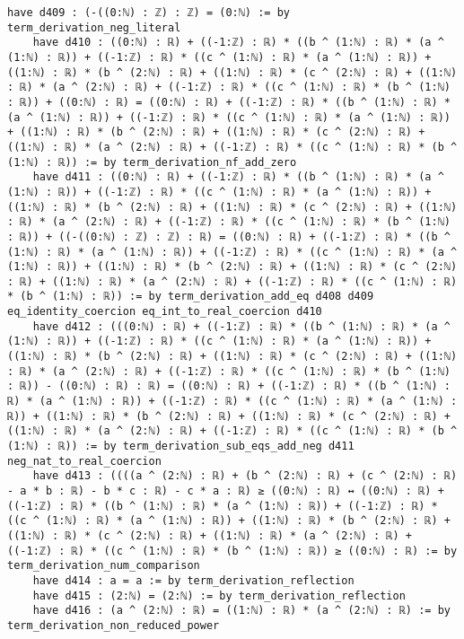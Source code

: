 \documentclass{article}
\begin{document}
\begin{tcolorbox}[colback=white!10, width=\linewidth]
\begin{lstlisting}[language=Lean4]
    have d409 : (-((0:ℕ) : ℤ) : ℤ) = (0:ℕ) := by term_derivation_neg_literal
    have d410 : ((0:ℕ) : ℝ) + ((-1:ℤ) : ℝ) * ((b ^ (1:ℕ) : ℝ) * (a ^ (1:ℕ) : ℝ)) + ((-1:ℤ) : ℝ) * ((c ^ (1:ℕ) : ℝ) * (a ^ (1:ℕ) : ℝ)) + ((1:ℕ) : ℝ) * (b ^ (2:ℕ) : ℝ) + ((1:ℕ) : ℝ) * (c ^ (2:ℕ) : ℝ) + ((1:ℕ) : ℝ) * (a ^ (2:ℕ) : ℝ) + ((-1:ℤ) : ℝ) * ((c ^ (1:ℕ) : ℝ) * (b ^ (1:ℕ) : ℝ)) + ((0:ℕ) : ℝ) = ((0:ℕ) : ℝ) + ((-1:ℤ) : ℝ) * ((b ^ (1:ℕ) : ℝ) * (a ^ (1:ℕ) : ℝ)) + ((-1:ℤ) : ℝ) * ((c ^ (1:ℕ) : ℝ) * (a ^ (1:ℕ) : ℝ)) + ((1:ℕ) : ℝ) * (b ^ (2:ℕ) : ℝ) + ((1:ℕ) : ℝ) * (c ^ (2:ℕ) : ℝ) + ((1:ℕ) : ℝ) * (a ^ (2:ℕ) : ℝ) + ((-1:ℤ) : ℝ) * ((c ^ (1:ℕ) : ℝ) * (b ^ (1:ℕ) : ℝ)) := by term_derivation_nf_add_zero
    have d411 : ((0:ℕ) : ℝ) + ((-1:ℤ) : ℝ) * ((b ^ (1:ℕ) : ℝ) * (a ^ (1:ℕ) : ℝ)) + ((-1:ℤ) : ℝ) * ((c ^ (1:ℕ) : ℝ) * (a ^ (1:ℕ) : ℝ)) + ((1:ℕ) : ℝ) * (b ^ (2:ℕ) : ℝ) + ((1:ℕ) : ℝ) * (c ^ (2:ℕ) : ℝ) + ((1:ℕ) : ℝ) * (a ^ (2:ℕ) : ℝ) + ((-1:ℤ) : ℝ) * ((c ^ (1:ℕ) : ℝ) * (b ^ (1:ℕ) : ℝ)) + ((-((0:ℕ) : ℤ) : ℤ) : ℝ) = ((0:ℕ) : ℝ) + ((-1:ℤ) : ℝ) * ((b ^ (1:ℕ) : ℝ) * (a ^ (1:ℕ) : ℝ)) + ((-1:ℤ) : ℝ) * ((c ^ (1:ℕ) : ℝ) * (a ^ (1:ℕ) : ℝ)) + ((1:ℕ) : ℝ) * (b ^ (2:ℕ) : ℝ) + ((1:ℕ) : ℝ) * (c ^ (2:ℕ) : ℝ) + ((1:ℕ) : ℝ) * (a ^ (2:ℕ) : ℝ) + ((-1:ℤ) : ℝ) * ((c ^ (1:ℕ) : ℝ) * (b ^ (1:ℕ) : ℝ)) := by term_derivation_add_eq d408 d409 eq_identity_coercion eq_int_to_real_coercion d410
    have d412 : (((0:ℕ) : ℝ) + ((-1:ℤ) : ℝ) * ((b ^ (1:ℕ) : ℝ) * (a ^ (1:ℕ) : ℝ)) + ((-1:ℤ) : ℝ) * ((c ^ (1:ℕ) : ℝ) * (a ^ (1:ℕ) : ℝ)) + ((1:ℕ) : ℝ) * (b ^ (2:ℕ) : ℝ) + ((1:ℕ) : ℝ) * (c ^ (2:ℕ) : ℝ) + ((1:ℕ) : ℝ) * (a ^ (2:ℕ) : ℝ) + ((-1:ℤ) : ℝ) * ((c ^ (1:ℕ) : ℝ) * (b ^ (1:ℕ) : ℝ)) - ((0:ℕ) : ℝ) : ℝ) = ((0:ℕ) : ℝ) + ((-1:ℤ) : ℝ) * ((b ^ (1:ℕ) : ℝ) * (a ^ (1:ℕ) : ℝ)) + ((-1:ℤ) : ℝ) * ((c ^ (1:ℕ) : ℝ) * (a ^ (1:ℕ) : ℝ)) + ((1:ℕ) : ℝ) * (b ^ (2:ℕ) : ℝ) + ((1:ℕ) : ℝ) * (c ^ (2:ℕ) : ℝ) + ((1:ℕ) : ℝ) * (a ^ (2:ℕ) : ℝ) + ((-1:ℤ) : ℝ) * ((c ^ (1:ℕ) : ℝ) * (b ^ (1:ℕ) : ℝ)) := by term_derivation_sub_eqs_add_neg d411 neg_nat_to_real_coercion
    have d413 : ((((a ^ (2:ℕ) : ℝ) + (b ^ (2:ℕ) : ℝ) + (c ^ (2:ℕ) : ℝ) - a * b : ℝ) - b * c : ℝ) - c * a : ℝ) ≥ ((0:ℕ) : ℝ) ↔ ((0:ℕ) : ℝ) + ((-1:ℤ) : ℝ) * ((b ^ (1:ℕ) : ℝ) * (a ^ (1:ℕ) : ℝ)) + ((-1:ℤ) : ℝ) * ((c ^ (1:ℕ) : ℝ) * (a ^ (1:ℕ) : ℝ)) + ((1:ℕ) : ℝ) * (b ^ (2:ℕ) : ℝ) + ((1:ℕ) : ℝ) * (c ^ (2:ℕ) : ℝ) + ((1:ℕ) : ℝ) * (a ^ (2:ℕ) : ℝ) + ((-1:ℤ) : ℝ) * ((c ^ (1:ℕ) : ℝ) * (b ^ (1:ℕ) : ℝ)) ≥ ((0:ℕ) : ℝ) := by term_derivation_num_comparison
    have d414 : a = a := by term_derivation_reflection
    have d415 : (2:ℕ) = (2:ℕ) := by term_derivation_reflection
    have d416 : (a ^ (2:ℕ) : ℝ) = ((1:ℕ) : ℝ) * (a ^ (2:ℕ) : ℝ) := by term_derivation_non_reduced_power

\end{lstlisting}
\end{tcolorbox}
\end{document}
